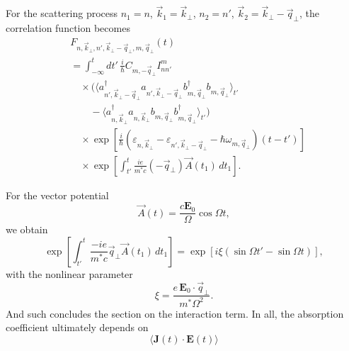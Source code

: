 \documentclass[%
 reprint,
 amsmath,amssymb,
 aps,
]{revtex4-2}
\begin{document}
For the scattering process
$n_1=n$, $\vec{k}_1=\vec{k}_{\perp}$,
$n_2=n'$, $\vec{k}_2=\vec{k}_{\perp}-\vec{q}_{\perp}$,
the correlation function becomes
\begin{equation}
\begin{aligned}
&F_{n,\vec{k}_{\perp},n',\vec{k}_{\perp}-\vec{q}_{\perp},m,\vec{q}_{\perp}}(t)\\
&=
\int_{-\infty}^{t}
dt'\,
\frac{i}{\hbar}
C_{m,-\vec{q}_{\perp}}
I_{n n'}^{m}
\\
&\quad\times
\Big(
\langle
a_{n',\vec{k}_{\perp}-\vec{q}_{\perp}}^{\dagger}
a_{n',\vec{k}_{\perp}-\vec{q}_{\perp}}
b_{m,\vec{q}_{\perp}}^{\dagger}
b_{m,\vec{q}_{\perp}}
\rangle_{t'}
\\
&\qquad
-
\langle
a_{n,\vec{k}_{\perp}}^{\dagger}
a_{n,\vec{k}_{\perp}}
b_{m,\vec{q}_{\perp}}
b_{m,\vec{q}_{\perp}}^{\dagger}
\rangle_{t'}
\Big)
\\
&\quad\times
\exp\left[
\frac{i}{\hbar}
(\varepsilon_{n,\vec{k}_{\perp}}
-
\varepsilon_{n',\vec{k}_{\perp}-\vec{q}_{\perp}}
-
\hbar \omega_{m,\vec{q}_{\perp}})
(t-t')
\right]
\\
&\quad\times
\exp\left[
\int_{t'}^{t}
\frac{ie}{m^* c}
(-\vec{q}_{\perp})
\vec{A}(t_1)
\, dt_1
\right].
\end{aligned}
\end{equation}

For the vector potential
\begin{equation}
\vec{A}(t)
=
\frac{c\mathbf{E}_0}{\Omega}
\cos \Omega t,
\end{equation}
we obtain
\begin{equation}
\exp\left[
\int_{t'}^{t}
\frac{-ie}{m^* c}
\vec{q}_{\perp}
\vec{A}(t_1)
\, dt_1
\right]
=
\exp\left[
i\xi
(\sin \Omega t' - \sin \Omega t)
\right],
\end{equation}
with the nonlinear parameter
\begin{equation}
\xi
=
\frac{e\,\mathbf{E}_0\cdot\vec{q}_{\perp}}
{m^* \Omega^2}.
\end{equation}
And such concludes the section on the interaction term. In all, the absorption coefficient ultimately depends on
\begin{equation}
    \langle \mathbf{J}(t) \cdot \mathbf{E}(t)\rangle
\end{equation}
\end{document}
